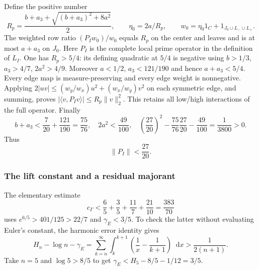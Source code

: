 \documentclass[11pt,a4paper]{article}
\numberwithin{equation}{section}
\theoremstyle{definition}\newtheorem{definition}[theorem]{Definition}
\theoremstyle{remark}\newtheorem{remark}[theorem]{Remark}
\newcommand{\ip}[2]{\langle#1,#2\rangle}\newcommand{\norm}[1]{\lVert#1\rVert}\newcommand{\abs}[1]{\lvert#1\rvert}
\newcommand{\dd}{\mathop{}\!\mathrm d}\newcommand{\one}{\mathbf1}
\newcommand{\PP}{P}\newcommand{\J}{J}\newcommand{\V}{V}\newcommand{\wo}{\mathcal W}
\begin{document}
Define the positive number
\[
 R_p=\frac{b+a_3+\sqrt{(b+a_3)^2+8a^2}}2,
 \qquad\eta_0=2a/R_p,
 \qquad w_0=\eta_0 1_C+1_{J_0\cup L_-\cup L_+}.
\]
The weighted row ratio $(\PP_Iw_0)/w_0$ equals $R_p$ on the center
and leaves and is at most $a+a_3$ on $J_0$. Here
$\PP_I$ is the complete local prime operator in the definition of $L_I$.
One has $R_p>5/4$: its defining quadratic at $5/4$ is negative using
$b>1/3$, $a_3>4/7$, $2a^2>4/9$.
Moreover $a<1/2$, $a_3<121/190$ and hence $a+a_3<5/4$.
Every edge map is measure-preserving and every edge weight is
nonnegative. Applying
$2\abs{uv}\le(w_y/w_x)u^2+(w_x/w_y)v^2$ on each symmetric edge,
and summing, proves
$\abs{\ip v{\PP_Iv}}\le R_p\norm v_2^2$.
This retains all low/high interactions of the full operator.
Finally
\[
 b+a_3<\frac7{20}+\frac{121}{190}=\frac{75}{76},\quad
 2a^2<\frac{49}{100},\quad
 \left(\frac{27}{20}\right)^2-\frac{75}{76}\frac{27}{20}
 -\frac{49}{100}=\frac1{3800}>0.
\]
Thus
\begin{equation}\label{c:eq:primeop}
 \norm{\PP_I}<\frac{27}{20}.
\end{equation}

\subsubsection{The lift constant and a residual majorant}
The elementary estimate
\begin{equation}\label{c:eq:cgamma}
 c_\Gamma<\frac65+\frac35+\frac{11}{7}+\frac{21}{10}
 =\frac{383}{70}
\end{equation}
uses $e^{6/5}>401/125>22/7$ and $\gamma_E<3/5$.
To check the latter without evaluating Euler's constant, the harmonic
error identity gives
\[
 H_n-\log n-\gamma_E
 =\sum_{k=n}^\infty\int_k^{k+1}
       \left(\frac1x-\frac1{k+1}\right)\dd x
 >\frac1{2(n+1)}.
\]
Take $n=5$ and $\log5>8/5$ to get
$\gamma_E<H_5-8/5-1/12=3/5$.
\end{document}
